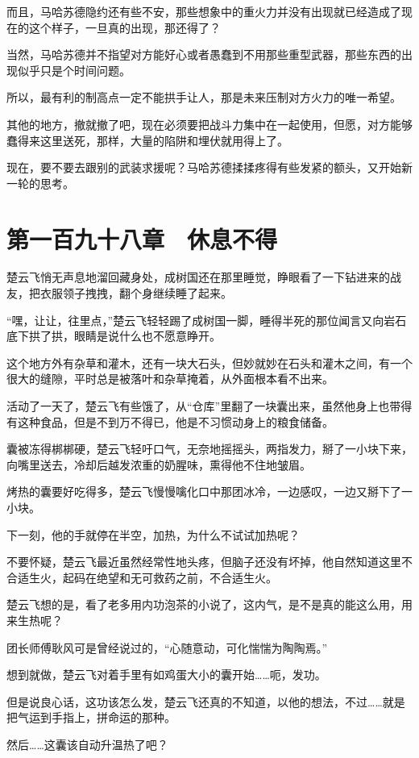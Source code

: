 而且，马哈苏德隐约还有些不安，那些想象中的重火力并没有出现就已经造成了现在的这个样子，一旦真的出现，那还得了？

当然，马哈苏德并不指望对方能好心或者愚蠢到不用那些重型武器，那些东西的出现似乎只是个时间问题。

所以，最有利的制高点一定不能拱手让人，那是未来压制对方火力的唯一希望。

其他的地方，撤就撤了吧，现在必须要把战斗力集中在一起使用，但愿，对方能够蠢得来这里送死，那样，大量的陷阱和埋伏就用得上了。

现在，要不要去跟别的武装求援呢？马哈苏德揉揉疼得有些发紧的额头，又开始新一轮的思考。

\section{第一百九十八章　休息不得}

楚云飞悄无声息地溜回藏身处，成树国还在那里睡觉，睁眼看了一下钻进来的战友，把衣服领子拽拽，翻个身继续睡了起来。

“嘿，让让，往里点，”楚云飞轻轻踢了成树国一脚，睡得半死的那位闻言又向岩石底下拱了拱，眼睛是说什么也不愿意睁开。

这个地方外有杂草和灌木，还有一块大石头，但妙就妙在石头和灌木之间，有一个很大的缝隙，平时总是被落叶和杂草掩着，从外面根本看不出来。

活动了一天了，楚云飞有些饿了，从“仓库”里翻了一块囊出来，虽然他身上也带得有这种食品，但是不到万不得已，他是不习惯动身上的粮食储备。

囊被冻得梆梆硬，楚云飞轻吁口气，无奈地摇摇头，两指发力，掰了一小块下来，向嘴里送去，冷却后越发浓重的奶腥味，熏得他不住地皱眉。

烤热的囊要好吃得多，楚云飞慢慢噙化口中那团冰冷，一边感叹，一边又掰下了一小块。

下一刻，他的手就停在半空，加热，为什么不试试加热呢？

不要怀疑，楚云飞最近虽然经常性地头疼，但脑子还没有坏掉，他自然知道这里不合适生火，起码在绝望和无可救药之前，不合适生火。

楚云飞想的是，看了老多用内功泡茶的小说了，这内气，是不是真的能这么用，用来生热呢？

团长师傅耿风可是曾经说过的，“心随意动，可化惴惴为陶陶焉。”

想到就做，楚云飞对着手里有如鸡蛋大小的囊开始……呃，发功。

但是说良心话，这功该怎么发，楚云飞还真的不知道，以他的想法，不过……就是把气运到手指上，拼命运的那种。

然后……这囊该自动升温热了吧？

